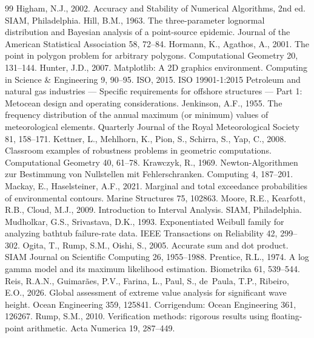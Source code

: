\documentclass[preprint,11pt,authoryear]{elsarticle}
\begin{document}
\begin{thebibliography}{99}
 Higham, N.J., 2002. Accuracy and Stability of Numerical Algorithms, 2nd ed. SIAM, Philadelphia.
 Hill, B.M., 1963. The three-parameter lognormal distribution and Bayesian analysis of a point-source epidemic. Journal of the American Statistical Association 58, 72--84.
 Hormann, K., Agathos, A., 2001. The point in polygon problem for arbitrary polygons. Computational Geometry 20, 131--144.
 Hunter, J.D., 2007. Matplotlib: A 2D graphics environment. Computing in Science \& Engineering 9, 90--95.
 ISO, 2015. ISO 19901-1:2015 Petroleum and natural gas industries --- Specific requirements for offshore structures --- Part 1: Metocean design and operating considerations.
 Jenkinson, A.F., 1955. The frequency distribution of the annual maximum (or minimum) values of meteorological elements. Quarterly Journal of the Royal Meteorological Society 81, 158--171.
 Kettner, L., Mehlhorn, K., Pion, S., Schirra, S., Yap, C., 2008. Classroom examples of robustness problems in geometric computations. Computational Geometry 40, 61--78.
 Krawczyk, R., 1969. Newton-Algorithmen zur Bestimmung von Nullstellen mit Fehlerschranken. Computing 4, 187--201.
 Mackay, E., Haselsteiner, A.F., 2021. Marginal and total exceedance probabilities of environmental contours. Marine Structures 75, 102863.
 Moore, R.E., Kearfott, R.B., Cloud, M.J., 2009. Introduction to Interval Analysis. SIAM, Philadelphia.
 Mudholkar, G.S., Srivastava, D.K., 1993. Exponentiated Weibull family for analyzing bathtub failure-rate data. IEEE Transactions on Reliability 42, 299--302.
 Ogita, T., Rump, S.M., Oishi, S., 2005. Accurate sum and dot product. SIAM Journal on Scientific Computing 26, 1955--1988.
 Prentice, R.L., 1974. A log gamma model and its maximum likelihood estimation. Biometrika 61, 539--544.
 Reis, R.A.N., Guimar\~aes, P.V., Farina, L., Paul, S., de~Paula, T.P., Ribeiro, E.O., 2026. Global assessment of extreme value analysis for significant wave height. Ocean Engineering 359, 125841. Corrigendum: Ocean Engineering 361, 126267.
 Rump, S.M., 2010. Verification methods: rigorous results using floating-point arithmetic. Acta Numerica 19, 287--449.

\end{thebibliography}
\end{document}
